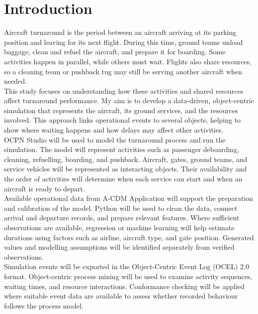 \chapter{Introduction}
\label{ch:intro}

Aircraft turnaround is the period between an aircraft arriving at its parking position and leaving for its next flight. During this time, ground teams unload baggage, clean and refuel the aircraft, and prepare it for boarding. Some activities happen in parallel, while others must wait. Flights also share resources, so a cleaning team or pushback tug may still be serving another aircraft when needed. \\

This study focuses on understanding how these activities and shared resources affect turnaround performance. My aim is to develop a data-driven, object-centric simulation that represents the aircraft, its ground services, and the resources involved. This approach links operational events to several objects, helping to show where waiting happens and how delays may affect other activities. \\

OCPN Studio will be used to model the turnaround process and run the simulation. The model will represent activities such as passenger deboarding, cleaning, refuelling, boarding, and pushback. Aircraft, gates, ground teams, and service vehicles will be represented as interacting objects. Their availability and the order of activities will determine when each service can start and when an aircraft is ready to depart. \\

Available operational data from A-CDM Application will support the preparation and calibration of the model. Python will be used to clean the data, connect arrival and departure records, and prepare relevant features. Where sufficient observations are available, regression or machine learning will help estimate durations using factors such as airline, aircraft type, and gate position. Generated values and modelling assumptions will be identified separately from verified observations. \\

Simulation events will be exported in the Object-Centric Event Log (OCEL) 2.0 format. Object-centric process mining will be used to examine activity sequences, waiting times, and resource interactions. Conformance checking will be applied where suitable event data are available to assess whether recorded behaviour follows the process model. \\ 

